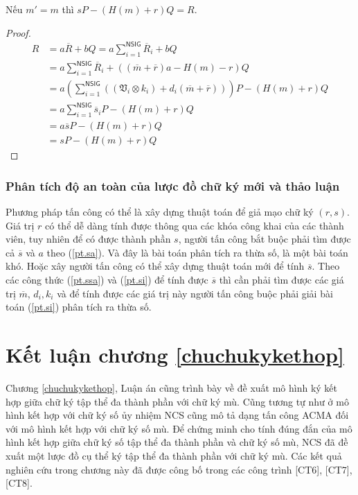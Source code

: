 \begin{theorem}
	Nếu $m'=m$ thì $sP -(H(m) + r)Q = R$.
\end{theorem}
\begin{proof}
	\begin{align*}
		R &=  a\overline{R} + bQ = a\sum_{i=1}^{\mathsf{NSIG}}\overline{R}_i + bQ \\
		&= a\sum_{i=1}^{\mathsf{NSIG}}\overline{R}_i + \left((\overline{m} + \overline{r})a -H(m) -r \right) Q \\
		&= a\left( \sum_{i=1}^{\mathsf{NSIG}} \left( (\mathfrak{V}_i \otimes k_i) + d_i(\overline{m} + \overline{r})\right) \right)P
		- \left(H(m) + r \right)Q \\
		&= 	a\sum_{i=1}^{\mathsf{NSIG}}\overline{s}_iP - \left(H(m) + r \right)Q \\
		&= 	a\overline{s}P - \left(H(m) + r \right)Q \\
		&= 	sP - \left(H(m) + r \right)Q 
	\end{align*}	
\end{proof}

\subsubsection {Phân tích độ an toàn của lược đồ chữ ký mới và thảo luận}


Phương pháp tấn công có thể là xây dựng thuật toán để giả mạo chữ ký $(r,s)$. Giá trị $r$ có thể dễ dàng tính được thông qua các khóa công khai của các thành viên, tuy nhiên để có được thành phần $s$, người tấn công bắt buộc phải tìm được cả $\overline{s}$ và $a$ theo (\ref{pt.sa}). Và đây là bài toán phân tích ra thừa số, là một bài toán khó. Hoặc xây người tấn công có thể xây dựng thuật toán mới để tính $\overline{s}$. Theo các công thức (\ref{pt.ssa}) và (\ref{pt.si}) để tính được $\overline{s}$ thì cần phải tìm được các giá trị $\overline{m}$, $d_i,k_i$ và để tính được các giá trị này người tấn công buộc phải giải bài toán (\ref{pt.si}) phân tích ra thừa số.

\section{\bf Kết luận chương \ref{chuchukykethop} }

Chương \ref{chuchukykethop}, Luận án cũng trình bày về đề xuất mô hình ký kết hợp giữa chữ ký tập thể đa thành phần với chữ ký mù. Cũng tương tự như ở mô hình kết hợp với chữ ký số ủy nhiệm NCS cũng mô tả dạng tấn công ACMA đối với mô hình kết hợp với chữ ký số mù. Để chứng minh cho tính đúng đắn của mô hình kết hợp giữa chữ ký số tập thể đa thành phần và chữ ký số mù, NCS đã đề xuất một lược đồ cụ thể ký tập thể đa thành phần với chữ ký mù. Các kết quả nghiên cứu trong chương này đã được công bố trong các công trình [CT6], [CT7], [CT8].%
